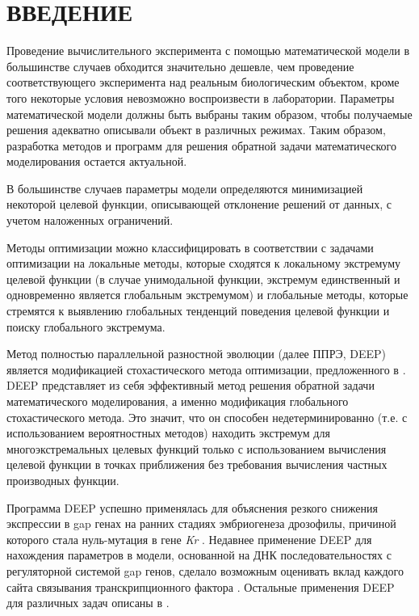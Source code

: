 \chapter*{ВВЕДЕНИЕ}

Проведение вычислительного эксперимента
с помощью математической модели
в большинстве случаев обходится значительно дешевле,
чем проведение соответствующего эксперимента
над реальным биологическим объектом,
кроме того некоторые условия
невозможно воспроизвести в лаборатории.
Параметры математической модели
должны быть выбраны таким образом,
чтобы получаемые решения
адекватно описывали объект в различных режимах.
Таким образом, разработка методов
и программ для решения обратной задачи
математического моделирования остается актуальной.

В большинстве случаев параметры модели
определяются минимизацией некоторой целевой функции,
описывающей отклонение решений от данных,
с учетом наложенных ограничений.

Методы оптимизации можно классифицировать
в соответствии с задачами оптимизации
на локальные методы,
которые сходятся к локальному экстремуму целевой функции
(в случае унимодальной функции,
экстремум единственный и одновременно
является глобальным экстремумом)
и глобальные методы,
которые стремятся к выявлению
глобальных тенденций поведения целевой функции
и поиску глобального экстремума.

Метод полностью параллельной разностной эволюции
(далее ППРЭ, DEEP) \cite{Kozlov11, Kozlov13}
является модификацией стохастического метода оптимизации,
предложенного в \cite{Storn95}.
DEEP представляет из себя эффективный метод
решения обратной задачи математического моделирования,
а именно модификация глобального стохастического метода.
Это значит, что он способен недетерминированно
(т.е. с использованием вероятностных методов)
находить экстремум для многоэкстремальных целевых функций
только с использованием вычисления целевой функции
в точках приближения без требования вычисления частных производных функции.

Программа DEEP успешно применялась для объяснения
резкого снижения экспрессии в gap генах
на ранних стадиях эмбриогенеза дрозофилы,
причиной которого стала нуль-мутация в гене \textit{Kr} \cite{kozlov2012modeling}.
Недавнее применение DEEP для нахождения
параметров в модели, основанной на
ДНК последовательностях с
регуляторной системой gap генов,
сделало возможным оценивать
вклад каждого сайта связывания
транскрипционного фактора \cite{kozlov2014sequence}.
Остальные применения DEEP
для различных задач описаны в
\cite{kozlov2013enhanced, ivanisenko2014new,
ivanisenko2013replication, kozlov2015differential}.

